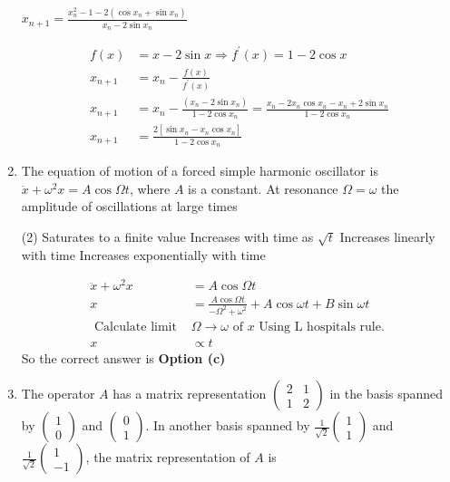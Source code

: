 \begin{enumerate}
\begin{tasks}
	\task[\textbf{d.}]  $x_{n+1}=\frac{x_{n}^{2}-1-2\left(\cos x_{n}+\sin x_{n}\right)}{x_{n}-2 \sin x_{n}}$
\end{tasks}
\begin{answer}
	\begin{align*}
	f(x)&=x-2 \sin x \Rightarrow f^{\prime}(x)=1-2 \cos x\\
	x_{n+1} &=x_{n}-\frac{f(x)}{f^{\prime}(x)} \\
	x_{n+1} &=x_{n}-\frac{\left(x_{n}-2 \sin x_{n}\right)}{1-2 \cos x_{n}}=\frac{x_{n}-2 x_{n} \cos x_{n}-x_{n}+2 \sin x_{n}}{1-2 \cos x_{n}} \\
	x_{n+1} &=\frac{2\left[\sin x_{n}-x_{n} \cos x_{n}\right]}{1-2 \cos x_{n}}
	\end{align*}
\end{answer}
\item  The equation of motion of a forced simple harmonic oscillator is $\ddot{x}+\omega^{2} x=A \cos \Omega t$, where $A$ is a constant. At resonance $\Omega=\omega$ the amplitude of oscillations at large times
 \begin{tasks}(2)
	\task[\textbf{a.}]Saturates to a finite value
	\task[\textbf{b.}]Increases with time as $\sqrt{t}$
	\task[\textbf{c.}]Increases linearly with time
	\task[\textbf{d.}]Increases exponentially with time
\end{tasks}
\begin{answer}
	\begin{align*}
	\ddot{x}+\omega^{2} x&=A \cos \Omega t\\
	x&=\frac{A \cos \Omega t}{-\Omega^{2}+\omega^{2}}+A \cos \omega t+B \sin \omega t\\
	\text { Calculate limit }&\Omega \rightarrow \omega \text { of } x \text { Using } \mathrm{L} \text { hospitals rule. }\\
	x &\propto t
	\end{align*}
		So the correct answer is \textbf{Option (c)}
\end{answer}
\item The operator $A$ has a matrix representation $\left(\begin{array}{ll}2 & 1 \\ 1 & 2\end{array}\right)$ in the basis spanned by $\left(\begin{array}{l}1 \\ 0\end{array}\right)$ and $\left(\begin{array}{l}0 \\ 1\end{array}\right)$. In another basis spanned by $\frac{1}{\sqrt{2}}\left(\begin{array}{l}1 \\ 1\end{array}\right)$ and $\frac{1}{\sqrt{2}}\left(\begin{array}{c}1 \\ -1\end{array}\right)$, the matrix representation of $A$ is

\end{enumerate}
